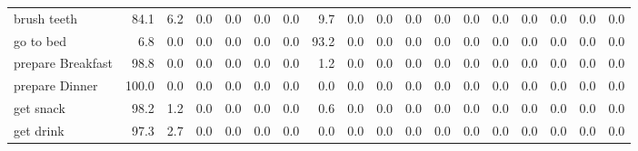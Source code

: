 \documentclass{article}
\begin{document}
\begin{sideways}
\begin{tabular}{lrrrrrrrrrrrrrrrrr}
brush teeth                   &        84.1 &                6.2 &           0.0 &               0.0 &                0.0 &                0.0 &              9.7 &                      0.0 &                   0.0 &              0.0 &              0.0 &                            0.0 &                      0.0 &                    0.0 &                                  0.0 &                          0.0 &                  0.0 \\
go to bed                     &         6.8 &                0.0 &           0.0 &               0.0 &                0.0 &                0.0 &             93.2 &                      0.0 &                   0.0 &              0.0 &              0.0 &                            0.0 &                      0.0 &                    0.0 &                                  0.0 &                          0.0 &                  0.0 \\
prepare Breakfast             &        98.8 &                0.0 &           0.0 &               0.0 &                0.0 &                0.0 &              1.2 &                      0.0 &                   0.0 &              0.0 &              0.0 &                            0.0 &                      0.0 &                    0.0 &                                  0.0 &                          0.0 &                  0.0 \\
prepare Dinner                &       100.0 &                0.0 &           0.0 &               0.0 &                0.0 &                0.0 &              0.0 &                      0.0 &                   0.0 &              0.0 &              0.0 &                            0.0 &                      0.0 &                    0.0 &                                  0.0 &                          0.0 &                  0.0 \\
get snack                     &        98.2 &                1.2 &           0.0 &               0.0 &                0.0 &                0.0 &              0.6 &                      0.0 &                   0.0 &              0.0 &              0.0 &                            0.0 &                      0.0 &                    0.0 &                                  0.0 &                          0.0 &                  0.0 \\
get drink                     &        97.3 &                2.7 &           0.0 &               0.0 &                0.0 &                0.0 &              0.0 &                      0.0 &                   0.0 &              0.0 &              0.0 &                            0.0 &                      0.0 &                    0.0 &                                  0.0 &                          0.0 &                  0.0 \\

\end{tabular}
\end{sideways}
\end{document}

